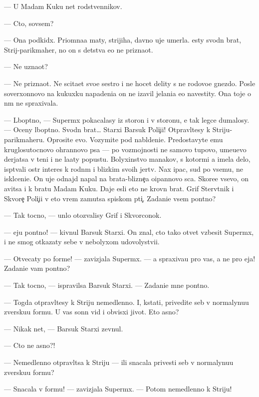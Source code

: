 \documentclass[12pt]{book}
\begin{document}
— U Madam Kuku net rodstvennikov.

— Cto, sovsem?

— Ona podkid{\yi}x. Pri{\y}omna{\y}a maty, strijiha, davno uje umerla. {\Y}esty svod\-n{\yi}{\y} brat, Strij-parikmaher, no on s detstva {\y}e{\y}o ne prizna{\y}ot.

— Ne uzna{\y}ot?

— Ne prizna{\y}ot. Ne sci\-ta\-{\y}et svo{\y}e{\y} sestro{\y} i ne hocet delity s ne{\y} rodovo{\y}e gnezdo. Posle soverxonnovo na kukuxku napadeni{\y}a on ne iz{\y}avil jelani{\y}a {\y}e{\y}o navestity. Ona toje o n{\e}m ne spraxivala.

— L{\io}bop{\yi}tno, — Superm{\yi}x pokacalasy iz storon{\yi} i v storonu, {\y}e{\y} tak legce dumalosy. — Oceny l{\io}bop{\yi}tno. Svodn{\yi}{\y} brat… Starxi{\y} Barsuk Poli{\c}i{\y}i! Ot\-prav\-l{\ia}{\y}\-tesy k Striju-parikmaheru. Oprosite {\y}evo. Vozymite pod nabl{\io}deni{\y}e. Predostavyte {\y}emu kruglosutocnovo ohrannovo psa — po vozmojnosti ne samovo tupovo, ume{\y}u{\x}evo derjatsa v teni i ne la{\y}aty popustu. Bolyxinstvo man{\y}akov, s ko\-to\-r{\yi}\-mi {\y}a imela delo, isp{\yi}t{\yi}vali ostr{\yi}{\y} interes k rodn{\yi}m i blizkim svo{\y}ih jertv. Nax {\X}ipac, sud{\ia} po vsemu, ne iskl{\io}ceni{\y}e. On uje od\-naj\-d{\yi} napal na brata-blizne{\c}a o{\x}ipannovo s{\yi}ca. Skore{\y}e vsevo, on {\y}avitsa i k bratu Madam Kuku. Daje {\y}esli eto ne krovn{\yi}{\y} brat. Grif Sterv{\ia}tnik i Skvore{\c} Poli{\c}i{\y}i v eto vrem{\ia} za{\y}mutsa spiskom pti{\c}. Zadani{\y}e vsem pon{\ia}tno?

— Tak tocno, — un{\yi}lo otozvalisy Grif i Skvorconok.

— {\Y}eju pon{\ia}tno! — kivnul Barsuk Starxi{\y}. On znal, cto tako{\y} otvet vzbesit Superm{\yi}x, i ne smog otkazaty sebe v nebolyxom udovolystvi{\y}i.

— Otvecaty po forme! — zavizjala Superm{\yi}x. — {\Y}a spraxiva{\y}u pro vas, a ne pro {\y}eja! Zadani{\y}e vam pon{\ia}tno?

— Tak tocno, — ispravilsa Barsuk Starxi{\y}. — Zadani{\y}e mne pon{\ia}tno.

— Togda otpravl{\ia}{\y}tesy k Striju nemedlenno. I, kstati, privedite seb{\ia} v nor\-maly\-nu\-{\y}u zversku{\y}u formu. U vas sonn{\yi}{\y} vid i obvisxi{\y} jivot. Eto {\y}asno?

— Nikak net, — Barsuk Starxi{\y} zevnul.

— Cto ne {\y}asno?!

— Nemedlenno otpravl{\ia}tsa k Striju — ili snacala privesti seb{\ia} v nor\-maly\-nu\-{\y}u zversku{\y}u formu?

— Snacala v formu! — zavizjala Superm{\yi}x. — Potom nemedlenno k Striju!
\end{document}
